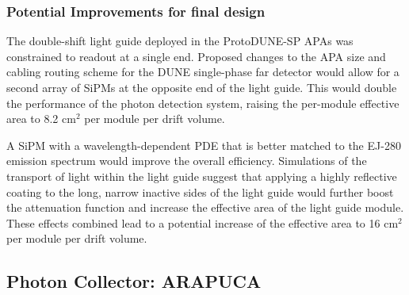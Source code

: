
\subsubsection{Potential Improvements for final design}

The double-shift light guide deployed in the ProtoDUNE-SP APAs was constrained to readout at a single end. Proposed changes to the APA size and cabling routing scheme for the DUNE single-phase far detector would allow for a second array of SiPMs at the opposite end of the light guide. This would double the performance of the photon detection system, raising the per-module effective area to 8.2 cm$^{2}$ per module per drift volume.

A SiPM with a wavelength-dependent PDE that is better matched to the EJ-280 emission spectrum would improve the overall efficiency. Simulations of the transport of light within the light guide suggest that applying a highly reflective coating to the long, narrow inactive sides of the light guide would further boost the attenuation function and increase the effective area of the light guide module. These effects combined lead to a potential increase of the effective area to 16 cm$^{2}$ per module per drift volume.



\subsection{Photon Collector: ARAPUCA}
\label{ssec:fdsp-pd-pc-arapuca}

